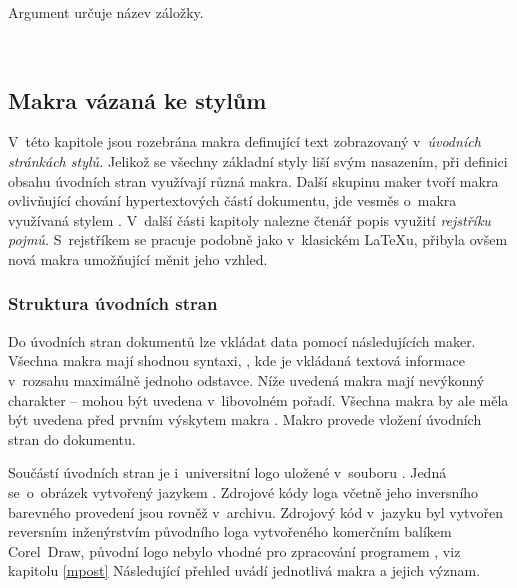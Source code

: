 \documentclass[12pt]{article}
\begin{document}
\smallskip
Argument  určuje název záložky.

\begin{example}
   \\
\end{example}
\par\egroup

\subsection{Makra vázaná ke stylům}
V~této kapitole jsou rozebrána makra definující text zobrazovaný 
v~\emph{úvodních stránkách stylů.}
Jelikož se všechny základní styly liší svým nasazením,
při definici obsahu úvodních stran využívají různá makra.
Další skupinu maker tvoří makra ovlivňující chování hypertextových částí
dokumentu, jde vesměs o~makra využívaná stylem .
V~další části kapitoly nalezne čtenář popis využití
\emph{rejstříku pojmů.}
S~rejstříkem se pracuje podobně jako v~klasickém \LaTeX u, 
přibyla ovšem nová makra umožňující měnit jeho vzhled.

\subsubsection*{Struktura úvodních stran}
Do úvodních stran dokumentů lze vkládat data pomocí následujících maker. 
Všechna makra mají shodnou syntaxi,
,
kde  je vkládaná textová informace v~rozsahu maximálně jednoho 
odstavce. Níže uvedená makra mají nevýkonný charakter -- mohou být uvedena
v~libovolném pořadí. Všechna makra by ale měla být uvedena před prvním 
výskytem makra . Makro  provede
vložení úvodních stran do dokumentu.

\medskip
Součástí úvodních stran je i~universitní logo uložené v~souboru 
. Jedná se~o~obrázek vytvořený jazykem \MP. Zdrojové kódy loga
včetně jeho inversního barevného provedení jsou rovněž v~archivu. Zdrojový
kód v~jazyku \MP{} byl vytvořen reversním inženýrstvím původního 
loga vytvořeného komerčním balíkem Corel~Draw, 
původní logo nebylo vhodné pro zpracování programem ,
viz kapitolu \ref{mpost}
Následující přehled uvádí jednotlivá makra a jejich význam.
\end{document}
